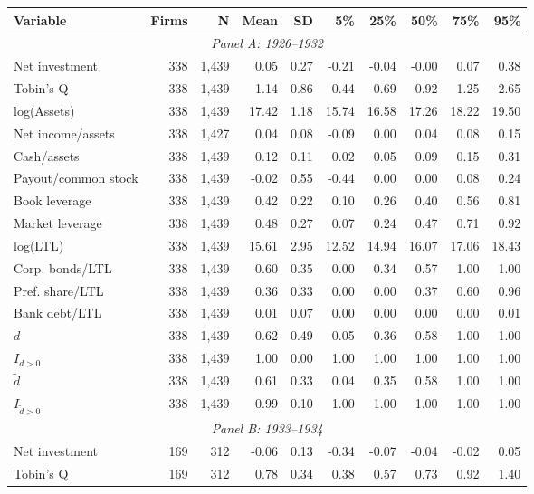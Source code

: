 \begin{threeparttable}
\begin{tabular}{lrrrrrrrrr}
\toprule
Variable & Firms & N & Mean & SD & 5\% & 25\% & 50\% & 75\% & 95\% \\
\midrule
\multicolumn{10}{c}{\textit{Panel A: 1926--1932}} \\
\midrule
Net investment & 338 & 1,439 & 0.05 & 0.27 & -0.21 & -0.04 & -0.00 & 0.07 & 0.38 \\
Tobin's Q & 338 & 1,439 & 1.14 & 0.86 & 0.44 & 0.69 & 0.92 & 1.25 & 2.65 \\
log(Assets) & 338 & 1,439 & 17.42 & 1.18 & 15.74 & 16.58 & 17.26 & 18.22 & 19.50 \\
Net income/assets & 338 & 1,427 & 0.04 & 0.08 & -0.09 & 0.00 & 0.04 & 0.08 & 0.15 \\
Cash/assets & 338 & 1,439 & 0.12 & 0.11 & 0.02 & 0.05 & 0.09 & 0.15 & 0.31 \\
Payout/common stock & 338 & 1,439 & -0.02 & 0.55 & -0.44 & 0.00 & 0.00 & 0.08 & 0.24 \\
Book leverage & 338 & 1,439 & 0.42 & 0.22 & 0.10 & 0.26 & 0.40 & 0.56 & 0.81 \\
Market leverage & 338 & 1,439 & 0.48 & 0.27 & 0.07 & 0.24 & 0.47 & 0.71 & 0.92 \\
log(LTL) & 338 & 1,439 & 15.61 & 2.95 & 12.52 & 14.94 & 16.07 & 17.06 & 18.43 \\
Corp. bonds/LTL & 338 & 1,439 & 0.60 & 0.35 & 0.00 & 0.34 & 0.57 & 1.00 & 1.00 \\
Pref. share/LTL & 338 & 1,439 & 0.36 & 0.33 & 0.00 & 0.00 & 0.37 & 0.60 & 0.96 \\
Bank debt/LTL & 338 & 1,439 & 0.01 & 0.07 & 0.00 & 0.00 & 0.00 & 0.00 & 0.01 \\
\ensuremath{d} & 338 & 1,439 & 0.62 & 0.49 & 0.05 & 0.36 & 0.58 & 1.00 & 1.00 \\
\ensuremath{I_{d>0}} & 338 & 1,439 & 1.00 & 0.00 & 1.00 & 1.00 & 1.00 & 1.00 & 1.00 \\
\ensuremath{\tilde{d}} & 338 & 1,439 & 0.61 & 0.33 & 0.04 & 0.35 & 0.58 & 1.00 & 1.00 \\
\ensuremath{I_{\tilde{d}>0}} & 338 & 1,439 & 0.99 & 0.10 & 1.00 & 1.00 & 1.00 & 1.00 & 1.00 \\
\midrule
\multicolumn{10}{c}{\textit{Panel B: 1933--1934}} \\
\midrule
Net investment & 169 & 312 & -0.06 & 0.13 & -0.34 & -0.07 & -0.04 & -0.02 & 0.05 \\
Tobin's Q & 169 & 312 & 0.78 & 0.34 & 0.38 & 0.57 & 0.73 & 0.92 & 1.40 \\

\end{tabular}
\end{threeparttable}
